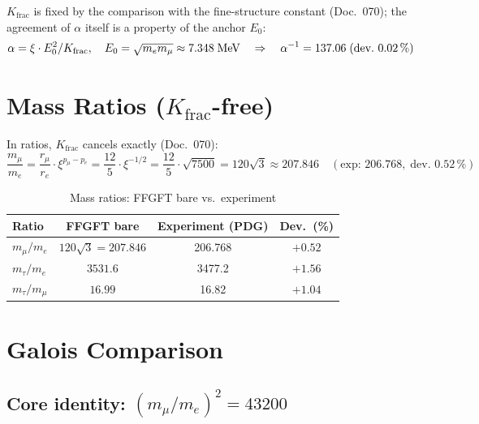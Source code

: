 $K_\text{frac}$ is fixed by the comparison with the fine-structure constant (Doc.~070);
the agreement of $\alpha$ itself is a property of the anchor $E_0$:
\begin{equation}
  \alpha = \xi \cdot E_0^2 / K_\text{frac},
  \quad E_0 = \sqrt{m_e m_\mu} \approx 7.348\;\text{MeV}
  \quad\Rightarrow\quad \alpha^{-1} = 137.06\;\text{(dev.\ 0.02\,\%)}
\end{equation}

\section{Mass Ratios ($K_\text{frac}$-free)}

In ratios, $K_\text{frac}$ cancels exactly (Doc.~070):
\begin{equation}
  \frac{m_\mu}{m_e} = \frac{r_\mu}{r_e} \cdot \xi^{p_\mu - p_e}
  = \frac{12}{5} \cdot \xi^{-1/2}
  = \frac{12}{5} \cdot \sqrt{7500}
  = 120\sqrt{3}
  \approx 207.846 \quad (\text{exp: }206.768,\;\text{dev.\ }0.52\,\%)
\end{equation}

\begin{table}[H]
\centering
\caption{Mass ratios: FFGFT bare vs.\ experiment}
\begin{tabular}{lccc}
\toprule
Ratio & FFGFT bare & Experiment (PDG) & Dev.\ (\%) \\
\midrule
$m_\mu/m_e$   & $120\sqrt{3} = 207.846$ & 206.768 & $+0.52$ \\
$m_\tau/m_e$  & $3531.6$                & 3477.2  & $+1.56$ \\
$m_\tau/m_\mu$& $16.99$                 & 16.82   & $+1.04$ \\
\bottomrule
\end{tabular}
\end{table}

\section{Galois Comparison}

\subsection{Core identity: $(m_\mu/m_e)^2 = 43200$}

